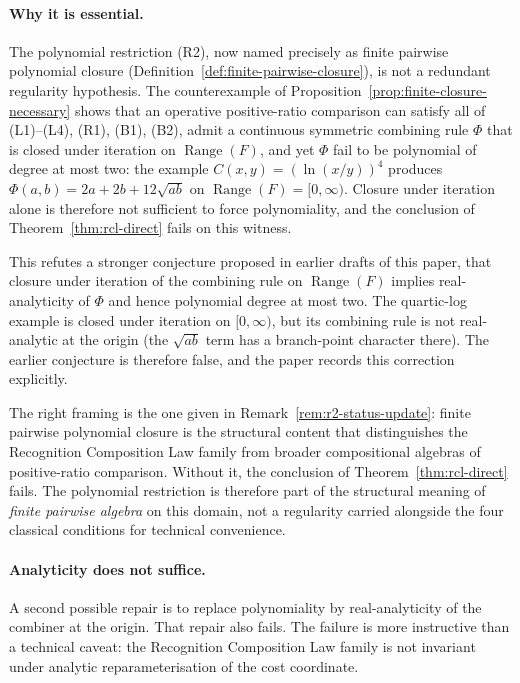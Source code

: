 \documentclass[11pt,a4paper]{article}
\theoremstyle{definition}
\theoremstyle{remark}
\begin{document}
\paragraph{Why it is essential.} The polynomial restriction (R2), now
named precisely as finite pairwise polynomial closure
(Definition~\ref{def:finite-pairwise-closure}), is not a redundant
regularity hypothesis. The counterexample of
Proposition~\ref{prop:finite-closure-necessary} shows that an operative
positive-ratio comparison can satisfy all of (L1)--(L4), (R1), (B1),
(B2), admit a continuous symmetric combining rule $\Phi$ that is closed
under iteration on $\operatorname{Range}(F)$, and yet $\Phi$ fail to be
polynomial of degree at most two: the example $C(x, y) = (\ln(x/y))^4$
produces $\Phi(a, b) = 2a + 2b + 12\sqrt{ab}$ on
$\operatorname{Range}(F) = [0, \infty)$. Closure under iteration alone
is therefore not sufficient to force polynomiality, and the
conclusion of Theorem~\ref{thm:rcl-direct} fails on this witness.

This refutes a stronger conjecture proposed in earlier drafts of this
paper, that closure under iteration of the combining rule on
$\operatorname{Range}(F)$ implies real-analyticity of $\Phi$ and hence
polynomial degree at most two. The quartic-log example is closed under
iteration on $[0, \infty)$, but its combining rule is not real-analytic
at the origin (the $\sqrt{ab}$ term has a branch-point character there).
The earlier conjecture is therefore false, and the paper records this
correction explicitly.

The right framing is the one given in
Remark~\ref{rem:r2-status-update}: finite pairwise polynomial closure
is the structural content that distinguishes the Recognition
Composition Law family from broader compositional algebras of
positive-ratio comparison. Without it, the conclusion of
Theorem~\ref{thm:rcl-direct} fails. The polynomial restriction is
therefore part of the structural meaning of \emph{finite pairwise
algebra} on this domain, not a regularity carried alongside the four
classical conditions for technical convenience.

\paragraph{Analyticity does not suffice.} A second possible repair is
to replace polynomiality by real-analyticity of the combiner at the
origin. That repair also fails. The failure is more instructive than a
technical caveat: the Recognition Composition Law family is not
invariant under analytic reparameterisation of the cost coordinate.
\end{document}
